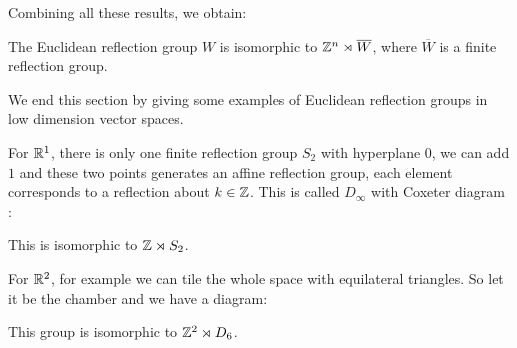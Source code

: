 \documentclass[../main.tex]{subfiles}
\begin{document}
Combining all these results, we obtain:
\begin{theorem}
    The Euclidean reflection group $W$ is isomorphic to $\mathbb{Z}^n \rtimes \overline W$, where $\overline W$ is a finite reflection group.
\end{theorem}

We end this section by giving some examples of Euclidean reflection groups in low dimension vector spaces.

For $\mathbb{R}^1$, there is only one finite reflection group $S_2$ with hyperplane $0$, we can add $1$ and these two points generates an affine reflection group, each element corresponds to a reflection about $k\in \mathbb{Z}$. This is called $D_{\infty}$ with Coxeter diagram :
\begin{figure}[H]
    \centering
{}
\end{figure}

This is isomorphic to $\mathbb{Z} \rtimes S_2$.

For $\mathbb{R}^2$, for example we can tile the whole space with equilateral triangles. So let it be the chamber and we have a diagram:

\begin{figure}[H]
\centering
{}
\end{figure}
This group is isomorphic to $\mathbb{Z}^2 \rtimes D_6$.
\end{document}
